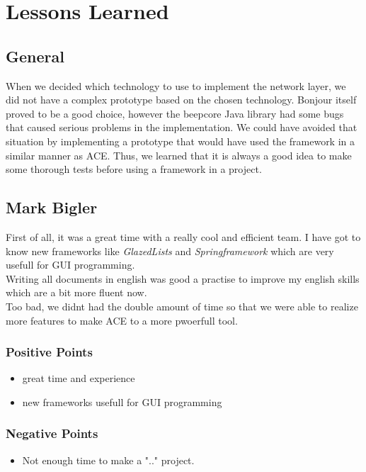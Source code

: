 \chapter{Lessons Learned}
\label{chapter:lessonslearned}



\section{General}
When we decided which technology to use to implement the network layer, we did
not have a complex prototype based on the chosen technology. Bonjour itself
proved to be a good choice, however the beepcore Java library had some
bugs that caused serious problems in the implementation. We could have
avoided that situation by implementing a prototype that would have used
the framework in a similar manner as ACE. Thus, we learned that it is
always a good idea to make some thorough tests before using a framework
in a project.



\section{Mark Bigler}
First of all, it was a great time with a really cool and efficient team. I have got to know new frameworks like \textit{GlazedLists} and \textit{Springframework} which are very usefull for GUI programming. \\

Writing all documents in english was good a practise to improve my english skills which are a bit more fluent now. \\

Too bad, we didnt had the double amount of time so that we were able to realize more features to make ACE to a more pwoerfull tool.
\subsection{Positive Points}
\begin{itemize}
\item great time and experience
\item new frameworks usefull for GUI programming
\end{itemize}

\subsection{Negative Points}
\begin{itemize}
\item Not enough time to make a ".." project.
\end{itemize}

